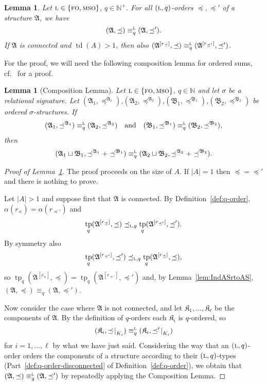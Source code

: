 \documentclass[11pt]{article}
\newtheorem{lemma}[theorem]{Lemma}
\newcommand{\logic}[1]{\textsc{#1}}
\newcommand{\logl}{\logic{l}}
\newcommand{\FO}{\logic{fo}}
\newcommand{\MSO}{\logic{mso}}
\newcommand{\eleq}[1][]{\equiv_{#1}}
\newcommand{\leleq}[1][]{\eleq[#1]^{\logl}}
\newcommand{\absval}[1]{\vert #1 \vert}
\newcommand{\rela}[2]{\ensuremath{{#1|}_{#2}}}
\newcommand{\relao}[2]{\rela{#1\!}{#2}}
\DeclareMathOperator{\tp}{tp}
\newcommand{\struct}[1]{\mathfrak{#1}}
\newcommand{\AS}{\struct{A}}
\newcommand{\BS}{\struct{B}}
\newcommand{\KS}{\struct{K}}
\newcommand{\td}{\operatorname{td}}
\newcommand{\set}[1]{\{#1\}}
\newcommand{\N}{\mathbb{N}}
\newcommand{\Npos}{\mathbb{N}^{+}}
\newcommand{\disunion}{\sqcup}
\begin{document}
\begin{lemma}
  \label{lem:all-q-orders-are-equivalent}
  Let $\logl\in \set{\FO{}, \MSO{}}$, $q\in \Npos$. For all
  $(\logl,q)$-orders $\preceq, \preceq'$ of a structure $\AS$, we have
  \[
  (\AS,\preceq) \leleq[q] (\AS,\preceq').
  \]
  If $\AS$ is connected and
  $\td(A) > 1$, then also $(\AS^{[r_\preceq]},\preceq) \leleq[q]
  (\AS^{[r_{\preceq'}]},\preceq')$.
\end{lemma}

For the proof, we will need the following composition lemma for
ordered sums, cf.~\cite{Makowsky2004} for a proof.

\begin{lemma}[Composition Lemma]
  \label{lem:ordered-comp-lemma}
  Let $\logl\in\set{\FO, \MSO}$, $q\in \N$ and let $\sigma$ be a
  relational signature.  Let $(\AS_1,
  \preceq^{\AS_1})$,$(\AS_2,\preceq^{\AS_2})$,$(\BS_1,\preceq^{\BS_1})$,$(\BS_2,\preceq^{\BS_2})$
  be ordered $\sigma$-structures. If 
  \[
  (\AS_1,\preceq^{\AS_1})\leleq[q]
  (\AS_2,\preceq^{\AS_2})
  \quad\text{and}\quad
  (\BS_1,\preceq^{\BS_1})\leleq[q]
  (\BS_2,\preceq^{\BS_2}),
  \]
  then
  \[
  (\AS_1 \disunion \BS_1, \preceq^{\AS_1} + \preceq^{\BS_1})
  \leleq[q] (\AS_2 \disunion \BS_2, \preceq^{\AS_2} +
  \preceq^{\BS_2}).  \]
\end{lemma}

\begin{proof}[Proof of Lemma~\ref{lem:all-q-orders-are-equivalent}]
  The proof proceeds on the size of $A$. If $\absval{A} = 1$ then
  ${\preceq} = {\preceq'}$ and there is nothing to prove.

  Let $\absval{A} > 1$ and suppose first that $\AS$ is connected. By
  Definition~\ref{def:q-order},
  $\alpha(r_{\preceq}) = \alpha(r_{\preceq'})$ and
  \[
  \tp_q(\AS^{[r_{\preceq}]},\preceq) \preceq_{\logl,q}
  \tp_q(\AS^{[r_{\preceq'}]},\preceq').
  \]
  By symmetry also
  \[
  \tp_q(\AS^{[r_{\preceq'}]},\preceq') \preceq_{\logl,q}
  \tp_q(\AS^{[r_{\preceq}]},\preceq),
  \]
  so
  $\tp_q(\AS^{[r_{\preceq}]},\preceq)=\tp_q(\AS^{[r_{\preceq'}]},\preceq')$
  and, by Lemma~\ref{lem:IndASrtoAS}, $(\AS,\preceq) \equiv_q
  (\AS,\preceq')$.

  Now consider the case where $\AS$ is not connected, and let
  $\KS_1,\ldots,\KS_{\ell}$ be the components of $\AS$.
  By the definition of $q$-orders each $\KS_i$ is $q$-ordered, so
  \[
  (\KS_i,\relao{\preceq}{K_i}) \leleq[q]
  (\KS_i,\relao{\preceq'}{K_i})
  \]
  for $i = 1,\ldots,\ell$ by what we have just said. Considering the
  way that an $(\logl,q)$-order orders the components of a structure
  according to their $(\logl,q)$-types
  (Part~\ref{def:q-order-disconnected} of
  Definition~\ref{def:q-order}), we obtain that $(\AS,\preceq)
  \leleq[q] (\AS,\preceq')$ by repeatedly applying the
  Composition Lemma.
\end{proof}
\end{document}
